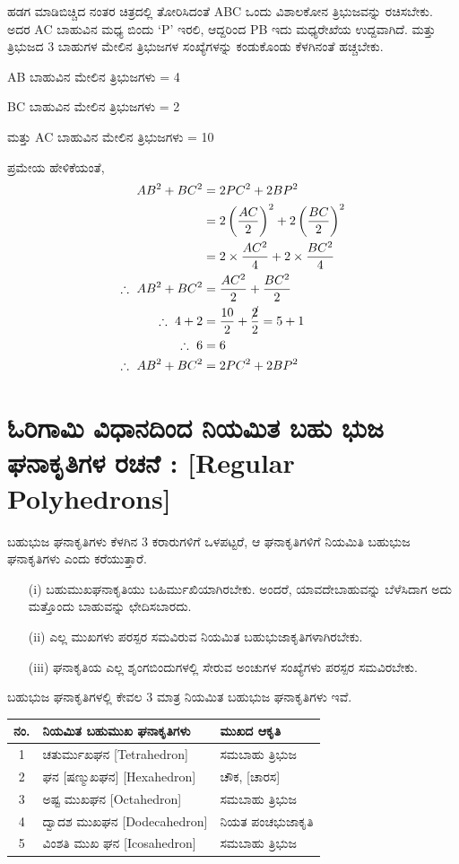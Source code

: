 ಹಡಗ ಮಾಡಿಬಿಚ್ಚಿದ ನಂತರ ಚಿತ್ರದಲ್ಲಿ ತೋರಿಸಿದಂತೆ ABC ಒಂದು ವಿಶಾಲಕೋನ  ತ್ರಿಭುಜವನ್ನು ರಚಿಸಬೇಕು. ಅದರ AC ಬಾಹುವಿನ ಮಧ್ಯ ಬಿಂದು  `P' ಇರಲಿ, ಆದ್ದರಿಂದ  PB ಇದು ಮಧ್ಯರೇಖೆಯ ಉದ್ದವಾಗಿದೆ. ಮತ್ತು ತ್ರಿಭುಜದ 3 ಬಾಹುಗಳ ಮೇಲಿನ ತ್ರಿಭುಜಗಳ ಸಂಖ್ಯೆಗಳನ್ನು ಕಂಡುಕೊಂಡು ಕೆಳಗಿನಂತೆ ಹಚ್ಚಬೇಕು. 

AB ಬಾಹುವಿನ ಮೇಲಿನ ತ್ರಿಭುಜಗಳು = 4

BC ಬಾಹುವಿನ ಮೇಲಿನ ತ್ರಿಭುಜಗಳು = 2

ಮತ್ತು AC ಬಾಹುವಿನ ಮೇಲಿನ ತ್ರಿಭುಜಗಳು = 10

ಪ್ರಮೇಯ ಹೇಳಿಕೆಯಂತೆ, 
\begin{align*}
AB^2 + BC^2 & = 2 PC^2 + 2 B P^2\\
& = 2 \left(\frac{AC}{2} \right)^2 + 2 \left(\frac{BC}{2} \right)^2\\
& = 2 \times \frac{AC^2}{4} + 2 \times \frac{BC^2}{4}\\
\therefore ~ AB^2 + BC^2 & = \frac{AC^2}{2} + \frac{BC^2}{2}\\
\therefore ~ 4+ 2 & = \frac{10}{2} + \frac{\cancel{2}}{2} = 5+1\\
\therefore ~ 6 & = 6 \\
\therefore ~ AB^2 + BC^2 & = 2 PC^2 + 2 BP^2 
\end{align*}

\section{ಓರಿಗಾಮಿ ವಿಧಾನದಿಂದ  ನಿಯಮಿತ ಬಹು ಭುಜ ಘನಾಕೃತಿಗಳ ರಚನೆ : [Regular Polyhedrons]}\label{sec1.11}%

ಬಹುಭುಜ ಘನಾಕೃತಿಗಳು ಕೆಳಗಿನ 3 ಕರಾರುಗಳಿಗೆ ಒಳಪಟ್ಟರೆ, ಆ ಘನಾಕೃತಿಗಳಿಗೆ ನಿಯಮಿತಿ ಬಹುಭುಜ ಘನಾಕೃತಿಗಳು ಎಂದು ಕರೆಯುತ್ತಾರೆ.

\smallskip

\begin{itemize}
\item[(i)] ಬಹುಮುಖಘನಾಕೃತಿಯು ಬಹಿರ್ಮುಖಿಯಾಗಿರಬೇಕು. ಅಂದರೆ, ಯಾವದೇ\break ಬಾಹುವನ್ನು ಬೆಳೆಸಿದಾಗ ಅದು ಮತ್ತೊಂದು ಬಾಹುವನ್ನು ಛೇದಿಸಬಾರದು.

\item[(ii)] ಎಲ್ಲ ಮುಖಗಳು ಪರಸ್ಪರ ಸಮವಿರುವ ನಿಯಮಿತ ಬಹುಭುಜಾಕೃತಿಗಳಾಗಿರಬೇಕು.

\item[(iii)] ಘನಾಕೃತಿಯ ಎಲ್ಲ ಶೃಂಗಬಿಂದುಗಳಲ್ಲಿ ಸೇರುವ ಅಂಚುಗಳ ಸಂಖ್ಯೆಗಳು ಪರಸ್ಪರ ಸಮವಿರಬೇಕು. 
\end{itemize}

ಬಹುಭುಜ ಘನಾಕೃತಿಗಳಲ್ಲಿ ಕೇವಲ 3 ಮಾತ್ರ ನಿಯಮಿತ ಬಹುಭುಜ ಘನಾಕೃತಿಗಳು ಇವೆ. 

\begin{tabular}{|c|l|l|}
\hline
ನಂ. & ನಿಯಮಿತ ಬಹುಮುಖ ಘನಾಕೃತಿಗಳು & ಮುಖದ ಆಕೃತಿ \\
\hline
1 & ಚತುರ್ಮುಖಘನ [Tetrahedron] &  ಸಮಬಾಹು ತ್ರಿಭುಜ\\
\hline
2 &ಘನ [ಷಣ್ಮುಖಘನ] [Hexahedron] &  ಚೌಕ, [ಚಾರಸ]\\
\hline
3 & ಅಷ್ಟ ಮುಖಘನ [Octahedron] & ಸಮಬಾಹು ತ್ರಿಭುಜ\\
\hline
4 & ದ್ವಾದಶ ಮುಖಘನ [Dodecahedron] & ನಿಯತ ಪಂಚಭುಜಾಕೃತಿ\\
\hline
5 & ವಿಂಶತಿ ಮುಖ ಘನ [Icosahedron] &  ಸಮಬಾಹು ತ್ರಿಭುಜ \\
\hline
\end{tabular}

